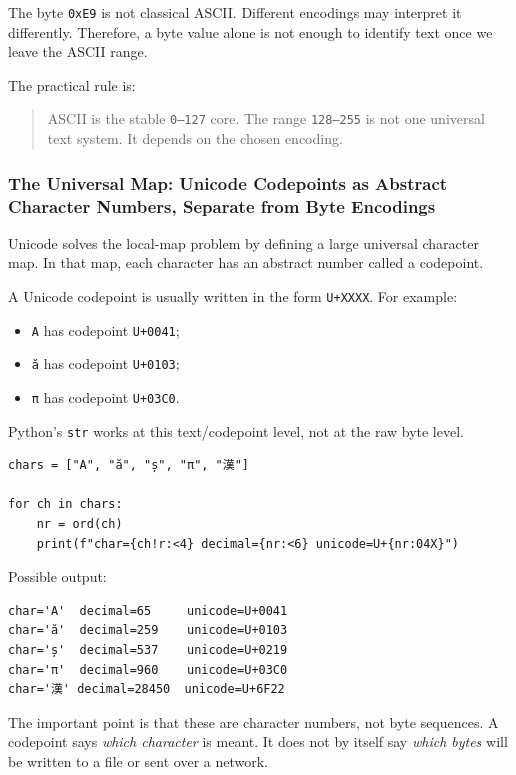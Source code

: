 The byte \texttt{0xE9} is not classical ASCII. Different encodings may interpret it differently. Therefore, a byte value alone is not enough to identify text once we leave the ASCII range.

The practical rule is:

\begin{quote}
ASCII is the stable \texttt{0--127} core. The range \texttt{128--255} is not one universal text system. It depends on the chosen encoding.
\end{quote}

\subsubsection{The Universal Map: Unicode Codepoints as Abstract Character Numbers, Separate from Byte Encodings}

Unicode solves the local-map problem by defining a large universal character map. In that map, each character has an abstract number called a codepoint.

A Unicode codepoint is usually written in the form \texttt{U+XXXX}. For example:

\begin{itemize}
    \item \texttt{A} has codepoint \texttt{U+0041};
    \item \texttt{ă} has codepoint \texttt{U+0103};
    \item \texttt{π} has codepoint \texttt{U+03C0}.
\end{itemize}

Python's \texttt{str} works at this text/codepoint level, not at the raw byte level.

\begin{verbatim}
chars = ["A", "ă", "ș", "π", "漢"]

for ch in chars:
    nr = ord(ch)
    print(f"char={ch!r:<4} decimal={nr:<6} unicode=U+{nr:04X}")
\end{verbatim}

Possible output:

\begin{verbatim}
char='A'  decimal=65     unicode=U+0041
char='ă'  decimal=259    unicode=U+0103
char='ș'  decimal=537    unicode=U+0219
char='π'  decimal=960    unicode=U+03C0
char='漢' decimal=28450  unicode=U+6F22
\end{verbatim}

The important point is that these are character numbers, not byte sequences. A codepoint says \emph{which character} is meant. It does not by itself say \emph{which bytes} will be written to a file or sent over a network.

